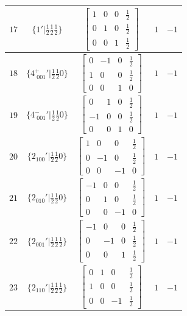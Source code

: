 \documentclass[fleqn,8pt]{jsarticle}
\begin{document}
\begin{longtable}{ccccc}
$ 17 $ & $ \{1{}'|\frac{1}{2} \frac{1}{2} \frac{1}{2}\} $ & $ \begin{bmatrix} 1 & 0 & 0 & \frac{1}{2} \\ 0 & 1 & 0 & \frac{1}{2} \\ 0 & 0 & 1 & \frac{1}{2} \end{bmatrix} $ & $ 1 $ & $ -1 $ \\ \hline
$ 18 $ & $ \{4^{+}_{\,\,001}{}'|\frac{1}{2} \frac{1}{2} 0\} $ & $ \begin{bmatrix} 0 & -1 & 0 & \frac{1}{2} \\ 1 & 0 & 0 & \frac{1}{2} \\ 0 & 0 & 1 & 0 \end{bmatrix} $ & $ 1 $ & $ -1 $ \\ \hline
$ 19 $ & $ \{4^{-}_{\,\,001}{}'|\frac{1}{2} \frac{1}{2} 0\} $ & $ \begin{bmatrix} 0 & 1 & 0 & \frac{1}{2} \\ -1 & 0 & 0 & \frac{1}{2} \\ 0 & 0 & 1 & 0 \end{bmatrix} $ & $ 1 $ & $ -1 $ \\ \hline
$ 20 $ & $ \{2{}_{100}{}'|\frac{1}{2} \frac{1}{2} 0\} $ & $ \begin{bmatrix} 1 & 0 & 0 & \frac{1}{2} \\ 0 & -1 & 0 & \frac{1}{2} \\ 0 & 0 & -1 & 0 \end{bmatrix} $ & $ 1 $ & $ -1 $ \\ \hline
$ 21 $ & $ \{2{}_{010}{}'|\frac{1}{2} \frac{1}{2} 0\} $ & $ \begin{bmatrix} -1 & 0 & 0 & \frac{1}{2} \\ 0 & 1 & 0 & \frac{1}{2} \\ 0 & 0 & -1 & 0 \end{bmatrix} $ & $ 1 $ & $ -1 $ \\ \hline
$ 22 $ & $ \{2{}_{001}{}'|\frac{1}{2} \frac{1}{2} \frac{1}{2}\} $ & $ \begin{bmatrix} -1 & 0 & 0 & \frac{1}{2} \\ 0 & -1 & 0 & \frac{1}{2} \\ 0 & 0 & 1 & \frac{1}{2} \end{bmatrix} $ & $ 1 $ & $ -1 $ \\ \hline
$ 23 $ & $ \{2{}_{110}{}'|\frac{1}{2} \frac{1}{2} \frac{1}{2}\} $ & $ \begin{bmatrix} 0 & 1 & 0 & \frac{1}{2} \\ 1 & 0 & 0 & \frac{1}{2} \\ 0 & 0 & -1 & \frac{1}{2} \end{bmatrix} $ & $ 1 $ & $ -1 $ \\ \hline

\end{longtable}
\end{document}
